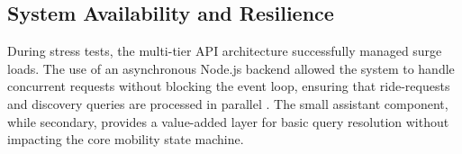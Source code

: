 \subsection{System Availability and Resilience}
During stress tests, the multi-tier API architecture successfully managed surge loads. The use of an asynchronous Node.js backend allowed the system to handle concurrent requests without blocking the event loop, ensuring that ride-requests and discovery queries are processed in parallel \cite{nodejs}. The small assistant component, while secondary, provides a value-added layer for basic query resolution without impacting the core mobility state machine.


